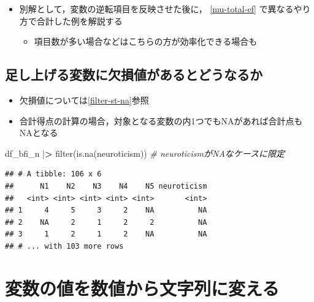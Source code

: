 \documentclass[
  xelatex,ja=standard, b5paper]{bxjsbook}
\newenvironment{Shaded}{\begin{snugshade}}{\end{snugshade}}
\newcommand{\CommentTok}[1]{\textcolor[rgb]{0.56,0.35,0.01}{\textit{#1}}}
\newcommand{\ErrorTok}[1]{\textcolor[rgb]{0.64,0.00,0.00}{\textbf{#1}}}
\newcommand{\FunctionTok}[1]{\textcolor[rgb]{0.00,0.00,0.00}{#1}}
\newcommand{\NormalTok}[1]{#1}
\newcommand{\SpecialCharTok}[1]{\textcolor[rgb]{0.00,0.00,0.00}{#1}}
\providecommand{\tightlist}{%
  \setlength{\itemsep}{0pt}\setlength{\parskip}{0pt}}
\begin{document}
\begin{itemize}
\tightlist
\item
  別解として，変数の逆転項目を反映させた後に， \ref{mu-total-ef} で異なるやり方で合計した例を解説する

  \begin{itemize}
  \tightlist
  \item
    項目数が多い場合などはこちらの方が効率化できる場合も
  \end{itemize}
\end{itemize}

\hypertarget{mu-total-na}{%
\subsection{足し上げる変数に欠損値があるとどうなるか}\label{mu-total-na}}

\begin{itemize}
\tightlist
\item
  欠損値については\ref{filter-st-na}参照
\item
  合計得点の計算の場合，対象となる変数の内1つでもNAがあれば合計点もNAとなる
\end{itemize}

\begin{Shaded}
\begin{Highlighting}[]
\NormalTok{df\_bfi\_n }\SpecialCharTok{|}\ErrorTok{\textgreater{}} 
  \FunctionTok{filter}\NormalTok{(}\FunctionTok{is.na}\NormalTok{(neuroticism))     }\CommentTok{\# neuroticismがNAなケースに限定}
\end{Highlighting}
\end{Shaded}

\begin{verbatim}
## # A tibble: 106 x 6
##      N1    N2    N3    N4    N5 neuroticism
##   <int> <int> <int> <int> <int>       <int>
## 1     4     5     3     2    NA          NA
## 2    NA     2     1     2     2          NA
## 3     1     2     1     2    NA          NA
## # ... with 103 more rows
\end{verbatim}

\hypertarget{ux5909ux6570ux306eux5024ux3092ux6570ux5024ux304bux3089ux6587ux5b57ux5217ux306bux5909ux3048ux308b}{%
\section{変数の値を数値から文字列に変える}\label{ux5909ux6570ux306eux5024ux3092ux6570ux5024ux304bux3089ux6587ux5b57ux5217ux306bux5909ux3048ux308b}}
\end{document}
